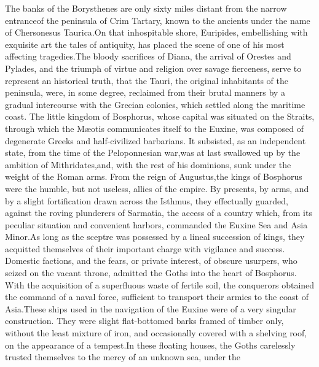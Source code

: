 
The banks of the Borysthenes are only sixty miles distant from
the narrow entrance\footnotemark[95] of the peninsula of Crim Tartary, known to
the ancients under the name of Chersonesus Taurica.\footnotemark[96] On that
inhospitable shore, Euripides, embellishing with exquisite art
the tales of antiquity, has placed the scene of one of his most
affecting tragedies.\footnotemark[97] The bloody sacrifices of Diana, the
arrival of Orestes and Pylades, and the triumph of virtue and
religion over savage fierceness, serve to represent an historical
truth, that the Tauri, the original inhabitants of the peninsula,
were, in some degree, reclaimed from their brutal manners by a
gradual intercourse with the Grecian colonies, which settled
along the maritime coast. The little kingdom of Bosphorus, whose
capital was situated on the Straits, through which the Mæotis
communicates itself to the Euxine, was composed of degenerate
Greeks and half-civilized barbarians. It subsisted, as an
independent state, from the time of the Peloponnesian war,\footnotemark[98] was
at last swallowed up by the ambition of Mithridates,\footnotemark[99] and, with
the rest of his dominions, sunk under the weight of the Roman
arms. From the reign of Augustus,\footnotemark[100] the kings of Bosphorus were
the humble, but not useless, allies of the empire. By presents,
by arms, and by a slight fortification drawn across the Isthmus,
they effectually guarded, against the roving plunderers of
Sarmatia, the access of a country which, from its peculiar
situation and convenient harbors, commanded the Euxine Sea and
Asia Minor.\footnotemark[101] As long as the sceptre was possessed by a lineal
succession of kings, they acquitted themselves of their important
charge with vigilance and success. Domestic factions, and the
fears, or private interest, of obscure usurpers, who seized on
the vacant throne, admitted the Goths into the heart of
Bosphorus. With the acquisition of a superfluous waste of fertile
soil, the conquerors obtained the command of a naval force,
sufficient to transport their armies to the coast of Asia.\footnotemark[102]
These ships used in the navigation of the Euxine were of a very
singular construction. They were slight flat-bottomed barks
framed of timber only, without the least mixture of iron, and
occasionally covered with a shelving roof, on the appearance of a
tempest.\footnotemark[103] In these floating houses, the Goths carelessly
trusted themselves to the mercy of an unknown sea, under the
